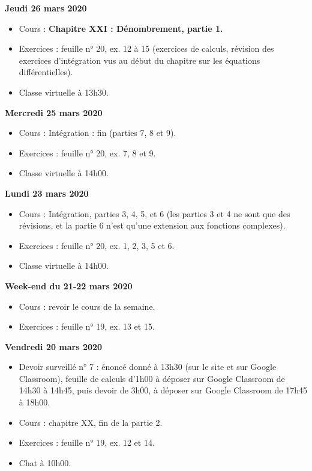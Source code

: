 \documentclass[12pt,a4paper]{article}
\begin{document}
\noindent\textbf{Jeudi 26 mars 2020}
\begin{itemize}
\item Cours : \bf Chapitre XXI \rm : Dénombrement, partie 1.
\item Exercices : feuille n° 20, ex. 12 à 15 (exercices de calculs, révision des exercices d'intégration vus au début du chapitre sur les équations différentielles).
\item Classe virtuelle à 13h30.\vspace{.4cm}
\end{itemize}

\noindent\textbf{Mercredi 25 mars 2020}
\begin{itemize}
\item Cours : Intégration : fin (parties 7, 8 et 9).
\item Exercices : feuille n° 20, ex. 7, 8 et 9.
\item Classe virtuelle à 14h00.\vspace{.4cm}
\end{itemize}

\noindent\textbf{\bf Lundi 23 mars 2020}
\begin{itemize}
\item Cours : Intégration, parties 3, 4, 5, et 6 (les parties 3 et 4 ne sont que des révisions, et la partie 6 n'est qu'une extension aux fonctions complexes).
\item Exercices : feuille n° 20, ex. 1, 2, 3, 5 et 6.
\item Classe virtuelle à 14h00.\vspace{.4cm}
\end{itemize}

\noindent\textbf{Week-end du 21-22 mars 2020}
\begin{itemize}
\item Cours : revoir le cours de la semaine.
\item Exercices : feuille n° 19, ex. 13 et 15.\vspace{.4cm}
\end{itemize}


\noindent\textbf{\bf Vendredi 20 mars 2020}
\begin{itemize}
\item Devoir surveillé n° 7 : énoncé donné à 13h30 (sur le site et sur Google Classroom), feuille de calculs d'1h00 à déposer sur Google Classroom de 14h30 à 14h45, puis devoir de 3h00, à déposer sur Google Classroom de 17h45 à 18h00.
\item Cours : chapitre XX, fin de la partie 2.
\item Exercices : feuille n° 19, ex. 12 et 14.
\item Chat à 10h00.\vspace{.4cm}
\end{itemize}
 
\end{document}
